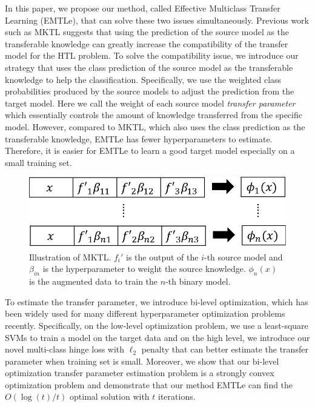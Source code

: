 In this paper, we propose our method, {called Effective Multiclass Transfer Learning (EMTLe)}, that can solve these two issues simultaneously. Previous work such as MKTL \cite{jie2011multiclass} suggests that using the prediction of the source model as the transferable knowledge can greatly increase the compatibility of the transfer model for the HTL problem. To solve the compatibility issue, we introduce our strategy that uses the class prediction of the source model as the transferable knowledge to help the classification. Specifically, we use the weighted class probabilities produced by the source models to adjust the prediction from the target model. Here we call the weight of each source model \textit{transfer parameter} which essentially controls the amount of knowledge transferred from the specific model. However, compared to MKTL, which also uses the class prediction as the transferable knowledge, EMTLe has fewer hyperparameters to estimate. Therefore, it is easier for EMTLe to learn a good target model especially on a small training set. %

\begin{figure}
	\centering
	\includegraphics[scale=0.5]{fig/mktl.png}
	\caption{Illustration of MKTL. $f_i'$ is the output of the $i$-th source model and $\beta_{in}$ is the hyperparameter to weight the source knowledge. $\phi_n(x)$ is the augmented data to train the $n$-th binary model.}
	\label{fig:mktl}
\end{figure}

To estimate the transfer parameter, we introduce bi-level optimization\cite{Pedregosa16}, which has been widely used for many different hyperparameter optimization problems recently. Specifically, on the low-level optimization problem, we use a least-square SVMs to train a model on the target data and on the high level, we introduce our novel multi-class hinge loss with $\ell_2$ penalty that can better estimate the transfer parameter when training set is small. Moreover, we show that our bi-level optimization transfer parameter estimation problem is a strongly convex optimization problem and demonstrate that our method EMTLe can find the $O({\log(t)}/{t})$ optimal solution with $t$ iterations. 

